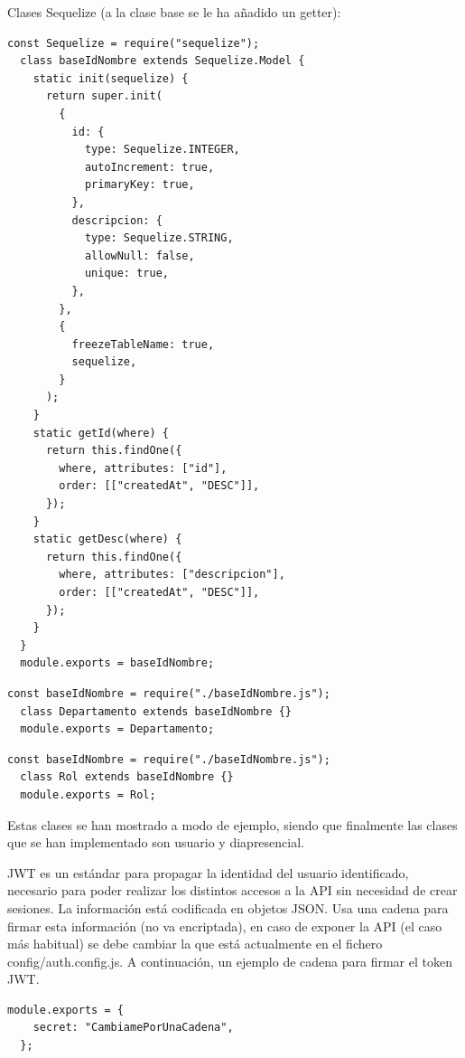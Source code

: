 \documentclass[11pt,spanish,listoffigures,listoftables]{tfgetsinf}
\begin{document}
Clases Sequelize (a la clase base se le ha añadido un getter):

\begin{lstlisting}[style=ES6, caption={Clase base}]
  const Sequelize = require("sequelize");
  class baseIdNombre extends Sequelize.Model {
    static init(sequelize) {
      return super.init(
        {
          id: {
            type: Sequelize.INTEGER,
            autoIncrement: true,
            primaryKey: true,
          },
          descripcion: {
            type: Sequelize.STRING,
            allowNull: false,
            unique: true,
          },
        },
        {          
          freezeTableName: true,
          sequelize,
        }
      );
    }
    static getId(where) {
      return this.findOne({
        where, attributes: ["id"],
        order: [["createdAt", "DESC"]],
      });
    }
    static getDesc(where) {
      return this.findOne({
        where, attributes: ["descripcion"],
        order: [["createdAt", "DESC"]],
      });
    }
  }
  module.exports = baseIdNombre;
\end{lstlisting}

\begin{lstlisting}[style=ES6, caption={Clase Despartamento}]
  const baseIdNombre = require("./baseIdNombre.js");
  class Departamento extends baseIdNombre {}
  module.exports = Departamento;
\end{lstlisting}

\begin{lstlisting}[style=ES6, caption={Clase Rol}]
  const baseIdNombre = require("./baseIdNombre.js");
  class Rol extends baseIdNombre {}
  module.exports = Rol;
\end{lstlisting}

Estas clases se han mostrado a modo de ejemplo, siendo que finalmente las clases que se han implementado son usuario y diapresencial.

JWT es un estándar para propagar la identidad del usuario identificado, necesario para poder realizar los distintos accesos a la API sin necesidad de crear sesiones.
La información está codificada en objetos JSON. Usa una cadena para firmar esta información (no va encriptada), en caso de exponer la API (el caso más habitual) se debe cambiar la que está actualmente en el fichero config/auth.config.js.
A continuación, un ejemplo de cadena para firmar el token JWT.

\begin{lstlisting}[style=ES6, caption={Configuración de la cadena para la firma JWT}]
  module.exports = {
    secret: "CambiamePorUnaCadena",
  };
\end{lstlisting}
\end{document}
